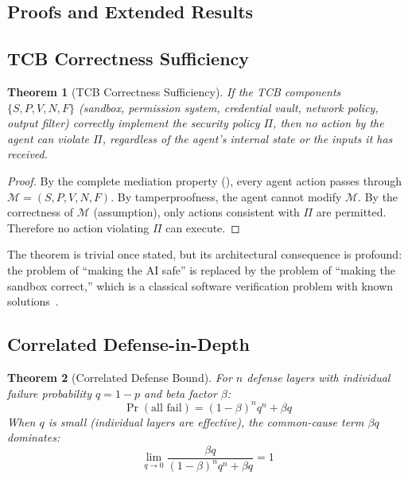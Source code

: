 \documentclass[11pt, a4paper, copyright]{googledeepmind}
\newtheorem{theorem}{Theorem}[section]
\begin{document}
\begin{appendices}

\section{Proofs and Extended Results}
\label{app:proofs}

\subsection{TCB Correctness Sufficiency}

\begin{theorem}[TCB Correctness Sufficiency]
\label{thm:tcb-sufficiency}
If the TCB components $\{S, P, V, N, F\}$ (sandbox, permission system, credential vault, network policy, output filter) correctly implement the security policy $\Pi$, then no action by the agent can violate $\Pi$, regardless of the agent's internal state or the inputs it has received.
\end{theorem}

\begin{proof}
By the complete mediation property (), every agent action passes through $\mathcal{M} = (S, P, V, N, F)$. By tamperproofness, the agent cannot modify $\mathcal{M}$. By the correctness of $\mathcal{M}$ (assumption), only actions consistent with $\Pi$ are permitted. Therefore no action violating $\Pi$ can execute.
\end{proof}

The theorem is trivial once stated, but its architectural consequence is profound: the problem of ``making the AI safe'' is replaced by the problem of ``making the sandbox correct,'' which is a classical software verification problem with known solutions~\citep{klein2009sel4}.

\subsection{Correlated Defense-in-Depth}

\begin{theorem}[Correlated Defense Bound]
\label{thm:correlated}
For $n$ defense layers with individual failure probability $q = 1-p$ and beta factor $\beta$:
\begin{equation}
\Pr(\text{all fail}) = (1-\beta)^n q^n + \beta q
\end{equation}
When $q$ is small (individual layers are effective), the common-cause term $\beta q$ dominates:
\begin{equation}
\lim_{q \to 0} \frac{\beta q}{(1-\beta)^n q^n + \beta q} = 1
\end{equation}
\end{theorem}


\end{appendices}
\end{document}
